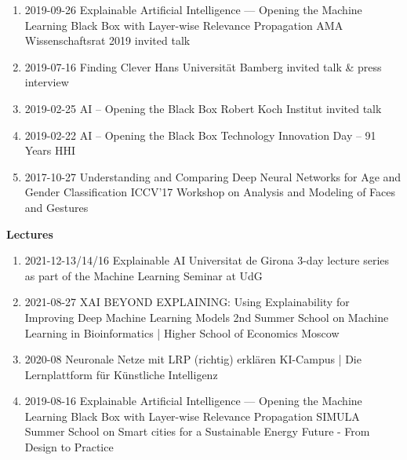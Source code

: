 \documentclass[10pt,a4paper]{article} %
\begin{document}
{\begin{enumerate}
                    {Interpretable Machine Learning through Layer-wise Relevance Propagation}
                    {Gesellschaft von Freunden des HHI e.V.}
    \item {}
                    {2019-09-26}
                    {Explainable Artificial Intelligence --- Opening the Machine Learning Black Box with Layer-wise Relevance Propagation}
                    {AMA Wissenschaftsrat 2019}
                    {invited talk}
    \item {}
                    {2019-07-16}
                    {Finding Clever Hans}
                    {Universität Bamberg}
                    {invited talk \& press interview}
    \item {}
                    {2019-02-25}
                    {AI -- Opening the Black Box}
                    {Robert Koch Institut}
                    {invited talk}
    \item {}
                    {2019-02-22}
                    {AI -- Opening the Black Box}
                    {Technology Innovation Day -- 91 Years HHI}
    \item {}
                    {2017-10-27}
                    {Understanding and Comparing Deep Neural Networks for Age and Gender Classification}
                    {ICCV'17 Workshop on Analysis and Modeling of Faces and Gestures}
\end{enumerate}
}

\headedsection
{\bf Lectures}{}
{
\begin{enumerate}
    \item {}
                    {2021-12-13/14/16}
                    {Explainable AI}
                    {Universitat de Girona}
                    {3-day lecture series as part of the Machine Learning Seminar at UdG}
    \item {}
                    {2021-08-27}
                    {XAI BEYOND EXPLAINING: Using Explainability for Improving Deep Machine Learning Models}
                    {2nd Summer School on Machine Learning in Bioinformatics | Higher School of Economics Moscow}
    \item {}
                    {2020-08}
                    {Neuronale Netze mit LRP (richtig) erklären}
                    {KI-Campus | Die Lernplattform für Künstliche Intelligenz}
    \item {}
                    {2019-08-16}
                    {Explainable Artificial Intelligence --- Opening the Machine Learning Black Box with Layer-wise Relevance Propagation}
                    {SIMULA Summer School on Smart cities for a Sustainable Energy Future - From Design to Practice}
\end{enumerate}
}
\end{document}
